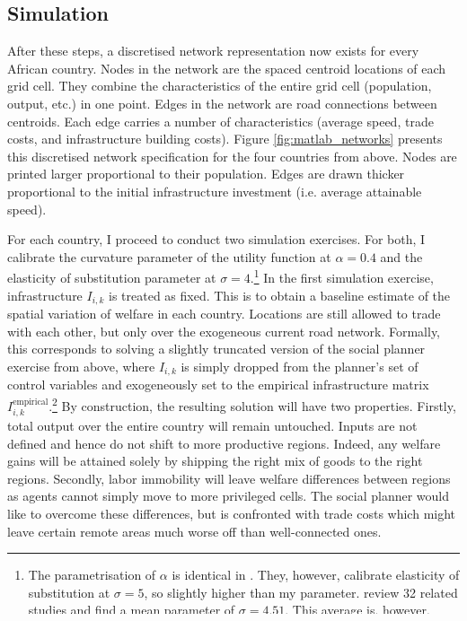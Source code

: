 \documentclass[11pt, oneside]{article}   	%
\begin{document}
\subsection{Simulation}

After these steps, a discretised network representation now exists for every African country. Nodes in the network are the spaced centroid locations of each grid cell. They combine the characteristics of the entire grid cell (population, output, etc.) in one point. Edges in the network are road connections between centroids. Each edge carries a number of characteristics (average speed, trade costs, and infrastructure building costs). Figure \eqref{fig:matlab_networks} presents this discretised network specification for the four countries from above. Nodes are printed larger proportional to their population. Edges are drawn thicker proportional to the initial infrastructure investment (i.e. average attainable speed).

For each country, I proceed to conduct two simulation exercises. For both, I calibrate the curvature parameter of the utility function at $\alpha = 0.4$ and the elasticity of substitution parameter at $\sigma=4$.\footnote{The parametrisation of $\alpha$ is identical in \cite{fajgelbaum_optimal_2017}. They, however, calibrate elasticity of substitution at $\sigma=5$, so slightly higher than my parameter. \cite{Head_GravityEquationsWorkhorse_2014} review 32 related studies and find a mean parameter of $\sigma=4.51$. This average is, however, driven by some positive outliers as the median parameter is much to the left of that. To account for this slant, I choose $\sigma=4$.} In the first simulation exercise, infrastructure $I_{i,k}$ is treated as fixed. This is to obtain a baseline estimate of the spatial variation of welfare in each country. Locations are still allowed to trade with each other, but only over the exogeneous current road network. Formally, this corresponds to solving a slightly truncated version of the social planner exercise from above, where $I_{i,k}$ is simply dropped from the planner's set of control variables and exogeneously set to the empirical infrastructure matrix $I_{i,k}^{\textrm{empirical}}$.\footnote{Recall that the optimal network allocation exercise nests the problem of solving for optimal trade flows. Hence, every other aspect of the model remains unaffected by fixing $I_{i,k}$. Trivially, this makes the \emph{Network Building Constraint} \eqref{eq:network_building} non-binding. The same outcome could be achieved at much higher computational costs by simply introducing an additional constraint $I_{i,k} = I_{i,k}^{\textrm{empirical}}$ to the social planner's problem.} By construction, the resulting solution will have two properties. Firstly, total output over the entire country will remain untouched. Inputs are not defined and hence do not shift to more productive regions. Indeed, any welfare gains will be attained solely by shipping the right mix of goods to the right regions. Secondly, labor immobility will leave welfare differences between regions as agents cannot simply move to more privileged cells. The social planner would like to overcome these differences, but is confronted with trade costs which might leave certain remote areas much worse off than well-connected ones.
\end{document}
